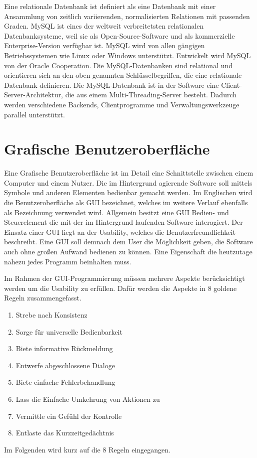 \documentclass[a4paper,titlepage,halfparskip,12pt]{scrreprt}
\begin{document}
\begin{onehalfspacing}
Eine relationale Datenbank ist definiert als eine Datenbank mit einer Ansammlung von zeitlich variierenden, normalisierten Relationen mit passenden Graden.
MySQL ist eines der weltweit verbreitetsten relationalen Datenbanksysteme, weil sie als Open-Source-Software und als kommerzielle Enterprise-Version verfügbar ist. MySQL wird von allen gängigen Betriebssystemen wie Linux oder Windows unterstützt. Entwickelt wird MySQL von der Oracle Cooperation. Die MySQL-Datenbanken sind relational und orientieren sich an den oben genannten Schlüsselbegriffen, die eine relationale Datenbank definieren. Die MySQL-Datenbank ist in der Software eine Client-Server-Architektur, die aus einem Multi-Threading-Server besteht. Dadurch werden verschiedene Backends, Clientprogramme und Verwaltungswerkzeuge parallel unterstützt.\cite{MysqlDoc}
\newpage

\section{Grafische Benutzeroberfläche}
\label{sec:Benutzeroberfläche}
Eine Grafische Benutzeroberfläche ist im Detail eine Schnittstelle zwischen einem Computer und einem Nutzer. Die im Hintergrund agierende Software soll mittels Symbole und anderen Elementen bedienbar gemacht werden. Im Englischen wird die Benutzeroberfläche als \ac{GUI} bezeichnet, welches im weitere Verlauf ebenfalls als Bezeichnung verwendet wird. Allgemein besitzt eine \ac{GUI} Bedien- und Steuerelement die mit der im Hintergrund laufenden Software interagiert. Der Einsatz einer \ac{GUI} liegt an der Usability, welches die Benutzerfreundlichkeit beschreibt. Eine \ac{GUI} soll demnach dem User die Möglichkeit geben, die Software auch ohne großen Aufwand bedienen zu können. Eine Eigenschaft die heutzutage nahezu jedes Programm beinhalten muss. \cite{thesmann2016interface}

Im Rahmen der GUI-Programmierung müssen mehrere Aspekte berücksichtigt werden um die Usability zu erfüllen. Dafür werden die Aspekte in 8 goldene Regeln zusammengefasst.
\begin{enumerate}
	\item Strebe nach Konsistenz
	\item Sorge für universelle Bedienbarkeit
	\item Biete informative Rückmeldung
	\item Entwerfe abgeschlossene Dialoge
	\item Biete einfache Fehlerbehandlung
	\item Lass die Einfache Umkehrung von Aktionen zu
	\item Vermittle ein Gefühl der Kontrolle
	\item Entlaste das Kurzzeitgedächtnis
\end{enumerate}
Im Folgenden wird kurz auf die 8 Regeln eingegangen.


\end{onehalfspacing}
\end{document}
